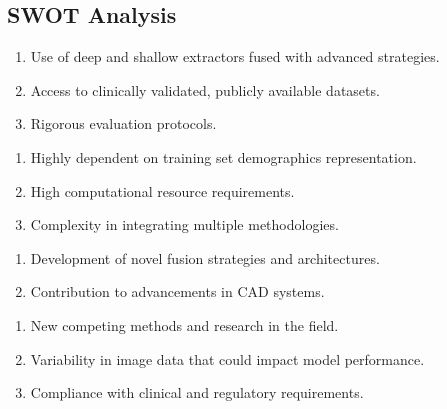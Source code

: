 \subsection{SWOT Analysis}
\begin{tcbraster}[raster columns=2, boxrule=0mm, arc=0mm]
\begin{tcolorbox}[equal height group=A, size=fbox, colback=swotS!60, colframe=swotS!80!black, title=\textsc{strengths}]
\begin{enumerate}
    \item Use of deep and shallow extractors fused with advanced strategies.
    \item Access to clinically validated, publicly available datasets.
    \item Rigorous evaluation protocols.
\end{enumerate}
\end{tcolorbox}
\begin{tcolorbox}[equal height group=A, size=fbox, colback=swotW!60, colframe=swotW!80!black, title=\textsc{weaknesses}]
\begin{enumerate}
    \item Highly dependent on training set demographics representation.
    \item High computational resource requirements.
    \item Complexity in integrating multiple methodologies.
\end{enumerate}
\end{tcolorbox}
\begin{tcolorbox}[equal height group=B, size=fbox, colback=swotO!60, colframe=swotO!80!black, title=\textsc{opportunities}]
\begin{enumerate}
    \item Development of novel fusion strategies and architectures.
    \item Contribution to advancements in CAD systems.
\end{enumerate}
\end{tcolorbox}
\begin{tcolorbox}[equal height group=B, size=fbox, colback=swotT!60, colframe=swotT!80!black, title=\textsc{threats}]
\begin{enumerate}
    \item New competing methods and research in the field.
    \item Variability in image data that could impact model performance.
    \item Compliance with clinical and regulatory requirements.
\end{enumerate}
\end{tcolorbox}
\end{tcbraster}

